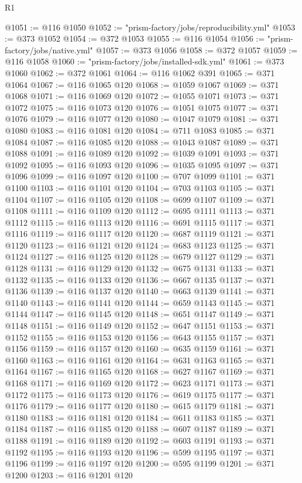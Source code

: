 \begin{lexlean}{R1}
\begin{coremodule}
@1051 := @116 @1050
@1052 := "prism-factory/jobs/reproducibility.yml"
@1053 := @373 @1052
@1054 := @372 @1053
@1055 := @116 @1054
@1056 := "prism-factory/jobs/native.yml"
@1057 := @373 @1056
@1058 := @372 @1057
@1059 := @116 @1058
@1060 := "prism-factory/jobs/installed-sdk.yml"
@1061 := @373 @1060
@1062 := @372 @1061
@1064 := @116 @1062 @391
@1065 := @371 @1064
@1067 := @116 @1065 @120
@1068 := @1059 @1067
@1069 := @371 @1068
@1071 := @116 @1069 @120
@1072 := @1055 @1071
@1073 := @371 @1072
@1075 := @116 @1073 @120
@1076 := @1051 @1075
@1077 := @371 @1076
@1079 := @116 @1077 @120
@1080 := @1047 @1079
@1081 := @371 @1080
@1083 := @116 @1081 @120
@1084 := @711 @1083
@1085 := @371 @1084
@1087 := @116 @1085 @120
@1088 := @1043 @1087
@1089 := @371 @1088
@1091 := @116 @1089 @120
@1092 := @1039 @1091
@1093 := @371 @1092
@1095 := @116 @1093 @120
@1096 := @1035 @1095
@1097 := @371 @1096
@1099 := @116 @1097 @120
@1100 := @707 @1099
@1101 := @371 @1100
@1103 := @116 @1101 @120
@1104 := @703 @1103
@1105 := @371 @1104
@1107 := @116 @1105 @120
@1108 := @699 @1107
@1109 := @371 @1108
@1111 := @116 @1109 @120
@1112 := @695 @1111
@1113 := @371 @1112
@1115 := @116 @1113 @120
@1116 := @691 @1115
@1117 := @371 @1116
@1119 := @116 @1117 @120
@1120 := @687 @1119
@1121 := @371 @1120
@1123 := @116 @1121 @120
@1124 := @683 @1123
@1125 := @371 @1124
@1127 := @116 @1125 @120
@1128 := @679 @1127
@1129 := @371 @1128
@1131 := @116 @1129 @120
@1132 := @675 @1131
@1133 := @371 @1132
@1135 := @116 @1133 @120
@1136 := @667 @1135
@1137 := @371 @1136
@1139 := @116 @1137 @120
@1140 := @663 @1139
@1141 := @371 @1140
@1143 := @116 @1141 @120
@1144 := @659 @1143
@1145 := @371 @1144
@1147 := @116 @1145 @120
@1148 := @651 @1147
@1149 := @371 @1148
@1151 := @116 @1149 @120
@1152 := @647 @1151
@1153 := @371 @1152
@1155 := @116 @1153 @120
@1156 := @643 @1155
@1157 := @371 @1156
@1159 := @116 @1157 @120
@1160 := @635 @1159
@1161 := @371 @1160
@1163 := @116 @1161 @120
@1164 := @631 @1163
@1165 := @371 @1164
@1167 := @116 @1165 @120
@1168 := @627 @1167
@1169 := @371 @1168
@1171 := @116 @1169 @120
@1172 := @623 @1171
@1173 := @371 @1172
@1175 := @116 @1173 @120
@1176 := @619 @1175
@1177 := @371 @1176
@1179 := @116 @1177 @120
@1180 := @615 @1179
@1181 := @371 @1180
@1183 := @116 @1181 @120
@1184 := @611 @1183
@1185 := @371 @1184
@1187 := @116 @1185 @120
@1188 := @607 @1187
@1189 := @371 @1188
@1191 := @116 @1189 @120
@1192 := @603 @1191
@1193 := @371 @1192
@1195 := @116 @1193 @120
@1196 := @599 @1195
@1197 := @371 @1196
@1199 := @116 @1197 @120
@1200 := @595 @1199
@1201 := @371 @1200
@1203 := @116 @1201 @120

\end{coremodule}
\end{lexlean}
